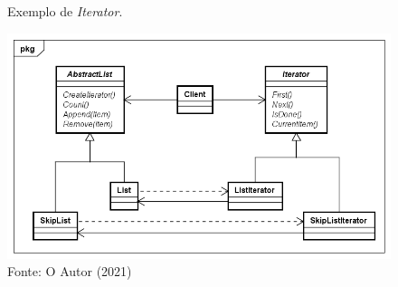 \begin{figure}[htb]
	\caption{\label{iterator_exemplo}Exemplo de \textit{Iterator}.}
	\begin{center}
	    \includegraphics[scale=0.5]{5_padroes-contexto-funcional/5.3_comportamentais/5.3.04_iterator/iterator_exemplo.png}
	\end{center}
  \caption*{Fonte: O Autor (2021)}
\end{figure}

